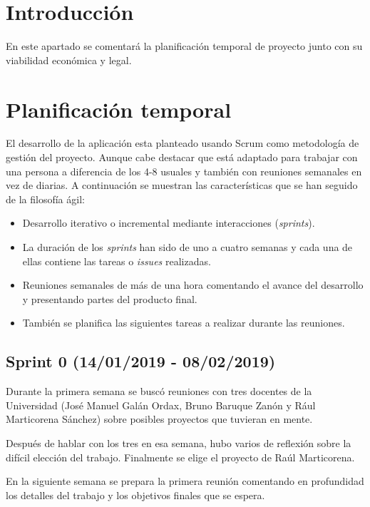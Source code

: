 
\section{Introducción}

En este apartado se comentará la planificación temporal de proyecto junto con su viabilidad económica y legal.

\section{Planificación temporal}

El desarrollo de la aplicación esta planteado usando Scrum como metodología de gestión del proyecto. Aunque cabe destacar que está adaptado para trabajar con una persona a diferencia de los 4-8 usuales y también con reuniones semanales en vez de diarias. A continuación se muestran las características que se han seguido de la filosofía ágil:


\begin{itemize}
	\item Desarrollo iterativo o incremental mediante interacciones (\textit{sprints}).
	\item La duración de los \textit{sprints} han sido de uno a cuatro semanas y cada una de ellas contiene las tareas o \textit{issues} realizadas.
	\item Reuniones semanales de más de una hora comentando el avance del desarrollo y presentando partes del producto final.
	\item También se planifica las siguientes tareas a realizar durante las reuniones.
	
\end{itemize}

\subsection{Sprint 0 (14/01/2019 - 08/02/2019)}

Durante la primera semana se buscó reuniones con tres docentes de la Universidad (José Manuel Galán Ordax, Bruno Baruque Zanón y Rául Marticorena Sánchez) sobre posibles proyectos que tuvieran en mente.

Después de hablar con los tres en esa semana, hubo varios de reflexión sobre la difícil elección del trabajo. Finalmente se elige el proyecto de Raúl Marticorena.

En la siguiente semana se prepara la primera reunión comentando en profundidad los detalles del trabajo y los objetivos finales que se espera.

